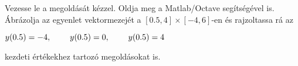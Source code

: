Vezesse le a 
\de{} megoldását kézzel. 
Oldja meg a Matlab/Octave   segítségével is. 
Ábrázolja az egyenlet vektormezejét a $[0.5,4]\times [-4,6]$-en és 
rajzoltassa rá az 
\centerline{$y(0.5)=-4, \hspace{0.8cm} y(0.5)=0, \hspace{0.8cm} y(0.5)=4$}
kezdeti értékekhez tartozó megoldásokat is.

